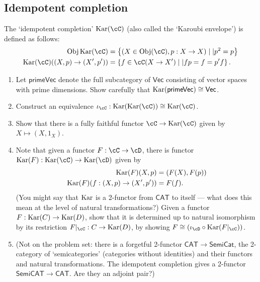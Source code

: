 \documentclass[12pt]{amsart}
\begin{document}
\subsection{Idempotent completion}
The `idempotent completion' $\Kar(\cC)$ (also called the `Karoubi envelope') is defined as follows:
\begin{align*}
\Obj \Kar(\cC) & = \left\{ (X \in \Obj(\cC), p :  X \to X) \mid| p^2 = p \right\} \\
\Kar(\cC)((X,p) \to (X',p')) & = \left\{ f \in \cC(X \to X') \mid| fp = f = p'f \right\}.
\end{align*}
\begin{enumerate}
\item Let $\mathsf{primeVec}$ denote the full subcategory of $\mathsf{Vec}$ consisting of vector spaces with prime dimensions. Show carefully that $\operatorname{Kar}(\mathsf{primeVec}) \cong \mathsf{Vec}$.
\item Construct an equivalence $\iota_\cC : \Kar(\Kar(\cC)) \cong \Kar(\cC)$.
\item Show that there is a fully faithful functor $\cC \to \Kar(\cC)$ given by $X \mapsto (X, 1_X)$.
\item Note that given a functor $F : \cC \to \cD$, there is functor $\Kar(F) : \Kar(\cC) \to \Kar(\cD)$ given by
\begin{align*}
\operatorname{Kar}(F)(X,p) & = (F(X), F(p)) \\
\operatorname{Kar}(F)(f : (X,p) \to (X',p')) & = F(f).
\end{align*}
(You might say that $\operatorname{Kar}$ is a 2-functor from $\mathsf{CAT}$ to itself --- what does this mean at the level of natural transformations?)
Given a functor $F : \operatorname{Kar}(C) \to \operatorname{Kar}(D)$, show that it is determined up to natural isomorphism by its restriction $F|_\cC : C \to \Kar(D)$, by showing $F \cong (\iota_\cD \circ \Kar(F|_\cC))$.
\item (Not on the problem set: there is a forgetful 2-functor $\mathsf{CAT} \to \mathsf{SemiCat}$, the 2-category of `semicategories' (categories without identities) and their functors and natural transformations. The idempotent completion gives a 2-functor $\mathsf{SemiCAT} \to \mathsf{CAT}$. Are they an adjoint pair?)
\end{enumerate}
\end{document}

